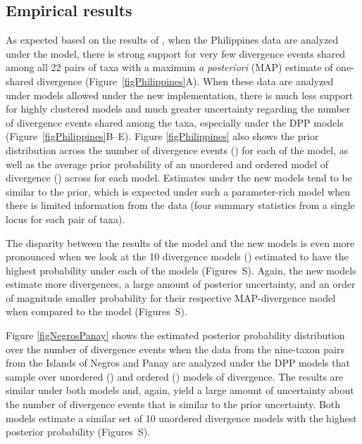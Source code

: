 \subsection*{Empirical results}
As expected based on the results of \citet{Oaks2012}, when the Philippines data
are analyzed under the \empModelOld model, there is strong support for very few
divergence events shared among all 22 pairs of taxa with a maximum \emph{a
posteriori} (MAP) estimate of one-shared divergence
(Figure~\ref{figPhilippines}A).
When these data are analyzed under models allowed under the new implementation,
there is much less support for highly clustered models and much greater
uncertainty regarding the number of divergence events shared among the taxa,
especially under the DPP models (Figure~\ref{figPhilippines}B--E).
Figure \ref{figPhilippines} also shows the prior distribution across the number
of divergence events (\divTimeNum) for each of the model, as well as the
average prior probability of an unordered and ordered model of divergence
(\divTimeIndexVector) across \divTimeNum for each model.
Estimates under the new models tend to be similar to the prior, which is
expected under such a parameter-rich model when there is limited information
from the data (four summary statistics from a single locus for each pair of
taxa).

The disparity between the results of the \empModelOld model and the new models
is even more pronounced when we look at the 10 divergence models
(\divTimeIndexVector) estimated to have the highest probability under each of the
models
(Figures~S).
Again, the new models estimate more divergences, a large amount of posterior
uncertainty, and an order of magnitude smaller probability for their respective
MAP-divergence model when compared to the \empModelOld model
(Figures~S).

Figure \ref{figNegrosPanay} shows the estimated posterior probability
distribution over the number of divergence events when the data from the
nine-taxon pairs from the Islands of Negros and Panay are analyzed under the DPP
models that sample over unordered (\npModelDPP) and ordered
(\npModelDPPOrdered) models of divergence.
The results are similar under both models and, again, yield a large amount of
uncertainty about the number of divergence events that is similar to the prior
uncertainty.
Both models estimate a similar set of 10 unordered divergence models with the
highest posterior probability
(Figures~S).

